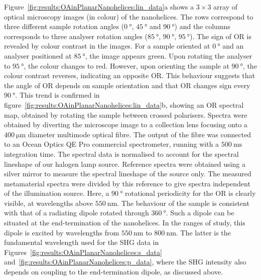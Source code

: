 Figure~\ref{fig:results:OAinPlanarNanohelices:lin_data}a shows a $3 \times 3$ array of optical microscopy images (in colour) of the nanohelices. The rows correspond to three different sample rotation angles ($\SI{0}{\degree}$, $\SI{45}{\degree}$ and $\SI{90}{\degree}$) and the columns corresponds to three analyser rotation angles ($\SI{85}{\degree}$, $\SI{90}{\degree}$, $\SI{95}{\degree}$).
The sign of OR is revealed by colour contrast in the images. For a sample oriented at $\SI{0}{\degree}$ and an analyser positioned at $\SI{85}{\degree}$, the image appears green.
Upon rotating the analyser to $\SI{95}{\degree}$, the colour changes to red. However, upon orienting the sample at $\SI{90}{\degree}$, the colour contrast reverses, indicating an opposite OR. This behaviour suggests that the angle of OR depends on sample orientation and that OR changes sign every $\SI{90}{\degree}$. 
This trend is confirmed in figure~\ref{fig:results:OAinPlanarNanohelices:lin_data}b, showing an OR spectral map, obtained by rotating the sample between crossed polarisers. 
Spectra were obtained by diverting the microscope image to a collection lens focusing onto a $\SI{400}{\micro\m}$ diameter multimode optical fibre. The output of the fibre was connected to an Ocean Optics QE Pro commercial spectrometer, running with a $\SI{500}{\milli\s}$ integration time. The spectral data is normalised to account for the spectral lineshape of our halogen lamp source. Reference spectra were obtained using a silver mirror to measure the spectral lineshape of the source only. The measured metamaterial spectra were divided by this reference to give spectra independent of the illumination source.
Here, a $\SI{90}{\degree}$ rotational periodicity for the OR is clearly visible, at wavelengths above $\SI{550}{\nano\m}$. The behaviour of the sample is consistent with that of a radiating dipole rotated through $\SI{360}{\degree}$. Such a dipole can be situated at the end-termination of the nanohelices. In the ranges of study, this dipole is excited by wavelengths from $\SI{550}{\nano\m}$ to $\SI{800}{\nano\m}$. The latter is the fundamental wavelength used for the SHG data in Figures~\ref{fig:results:OAinPlanarNanohelices:s_data} and~\ref{fig:results:OAinPlanarNanohelices:p_data}, where the SHG intensity also depends on coupling to the end-termination dipole, as discussed above.


